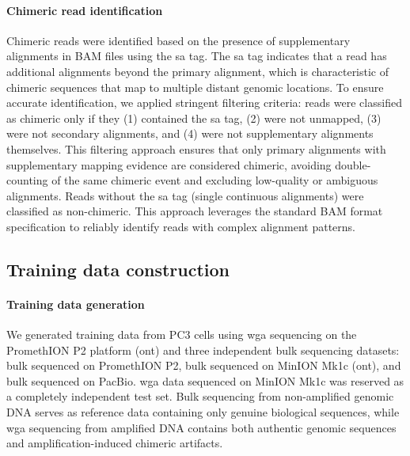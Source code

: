 \documentclass[pdflatex,sn-nature,lineno]{sn-jnl}%
\theoremstyle{thmstyleone}%
\theoremstyle{thmstyletwo}%
\theoremstyle{thmstylethree}%
\begin{document}
\paragraph{Chimeric read identification}
Chimeric reads were identified based on the presence of supplementary alignments in BAM files using the \gls{sa} tag.
The \gls{sa} tag indicates that a read has additional alignments beyond the primary alignment, which is characteristic of chimeric sequences that map to multiple distant genomic locations.
To ensure accurate identification, we applied stringent filtering criteria: reads were classified as chimeric only if they (1) contained the \gls{sa} tag, (2) were not unmapped, (3) were not secondary alignments, and (4) were not supplementary alignments themselves.
This filtering approach ensures that only primary alignments with supplementary mapping evidence are considered chimeric, avoiding double-counting of the same chimeric event and excluding low-quality or ambiguous alignments.
Reads without the \gls{sa} tag (single continuous alignments) were classified as non-chimeric.
This approach leverages the standard BAM format specification to reliably identify reads with complex alignment patterns.

\subsection*{Training data construction}

\paragraph{Training data generation}
We generated training data from PC3 cells using \gls{wga} sequencing on the PromethION P2 platform (\gls{ont}) and three independent bulk sequencing datasets: bulk sequenced on PromethION P2, bulk sequenced on MinION Mk1c (\gls{ont}), and bulk sequenced on PacBio.
\gls{wga} data sequenced on MinION Mk1c was reserved as a completely independent test set.
Bulk sequencing from non-amplified genomic DNA serves as reference data containing only genuine biological sequences, while \gls{wga} sequencing from amplified DNA contains both authentic genomic sequences and amplification-induced chimeric artifacts.
\end{document}
